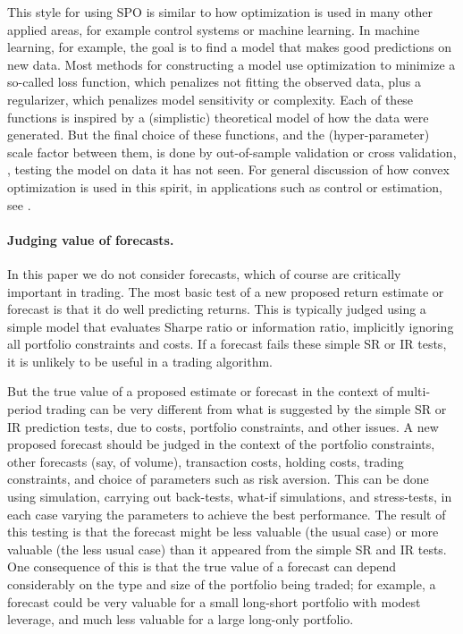\documentclass[openany]{now}
\begin{document}
This style for using SPO
is similar to how optimization is used in many other applied areas,
for example control systems or machine learning.   In machine learning,
for example, the goal is to find a model that makes good predictions
on new data.
Most methods for constructing a model use optimization to minimize a
so-called loss function, which penalizes not fitting the observed data,
plus a regularizer, which penalizes model sensitivity or complexity.
Each of these functions is inspired by a (simplistic)
theoretical model of how the data were generated.  But the final choice of
these functions, and the (hyper-parameter)
scale factor between them, is done by out-of-sample
validation or cross validation, \ie, testing the model on data it has not seen.
For general discussion of how convex optimization is used in
this spirit, in applications such as control or estimation,
see \cite{boyd2004convex}.

\paragraph{Judging value of forecasts.}
In this paper we do not consider forecasts, which of course are
critically important in trading.
The most basic test of a new proposed return estimate or forecast is that it
do well predicting returns.  This is typically judged using a simple model
that evaluates Sharpe ratio or information ratio, implicitly ignoring all
portfolio constraints and costs.
If a forecast fails these simple SR or IR tests, it is unlikely to be useful
in a trading algorithm.

But the true value of a proposed estimate or forecast in
the context of multi-period trading can be very different from what is
suggested by the simple SR or IR prediction tests, due to costs,
portfolio constraints, and other issues.
A new proposed forecast should be judged in the context of the portfolio
constraints, other forecasts (say, of volume), transaction costs, holding
costs, trading constraints, and choice of parameters such as risk aversion.
This can be done using simulation,
carrying out back-tests, what-if simulations, and stress-tests,
in each case varying the parameters to achieve the best performance.
The result of this testing is that the forecast might be less valuable
(the usual case) or more valuable (the less usual case) than it appeared
from the simple SR and IR tests.
One consequence of this is that the true value of a forecast can depend
considerably on the type and size of the portfolio being traded; for example, a
forecast could be very valuable for a small long-short portfolio with modest
leverage, and much less valuable for a large long-only portfolio.
\end{document}
